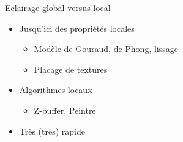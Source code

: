\begin{frame}{Eclairage global versus local}
\begin{itemize}
    \item Jusqu'ici des propriétés locales 
    \begin{itemize}
        \item Modèle de Gouraud, de Phong, lissage 
        \item Placage de textures 
    \end{itemize}
    \item Algorithmes locaux
    \begin{itemize}
        \item Z-buffer, Peintre
    \end{itemize}
    \item Très (très) rapide 
\end{itemize}    
\end{frame}

